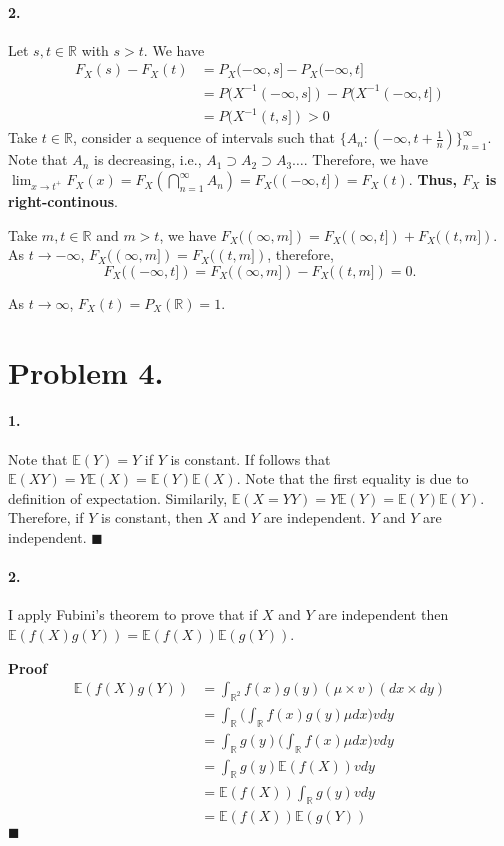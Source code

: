 \documentclass[11pt]{article}
\theoremstyle{definition}
\theoremstyle{boldtitle} %
\numberwithin{equation}{section}
\numberwithin{figure}{section}
\numberwithin{table}{section}
\begin{document}
\paragraph{2.} 
Let $s, t \in \mathbb{R}$ with $s > t$.
We have 
\begin{align*}
  F_X(s) - F_X(t) & = P_X(-\infty, s] - P_X(-\infty, t] \\ 
    & = P(X^{-1}(-\infty, s]) - P(X^{-1}(-\infty, t]) \\ 
    & = P(X^{-1}(t, s]) > 0
\end{align*}
Take $t \in \mathbb{R}$, consider a sequence of intervals such that 
$\{A_n: (-\infty, t + \frac{1}{n}) \}_{n=1}^\infty$.
Note that $A_n$ is decreasing, i.e., $A_1 \supset A_2 \supset A_3 \ldots$.
Therefore, we have $\lim_{x \rightarrow t^+} F_X(x) = F_X(\bigcap_{n=1}^\infty A_n) = F_X((-\infty, t]) = F_X(t)$.
\textbf{Thus, $F_X$ is right-continous}.

Take $m, t \in \mathbb{R}$ and $ m > t$, we have $F_X((\infty, m]) = F_X((\infty, t]) + F_X((t, m])$.
As $t \rightarrow -\infty$, $F_X((\infty, m]) = F_X((t, m])$,
therefore, 
\[
F_X((-\infty, t]) = F_X((\infty, m]) - F_X((t, m]) = 0.
\]

As $t \rightarrow \infty$, $F_X(t) = P_X(\mathbb{R}) = 1$.


\section*{Problem 4.} 
\paragraph{1.} Note that $\mathbb{E}(Y) = Y$ if $Y$ is constant.
If follows that $\mathbb{E}(XY) = Y \mathbb{E}(X) = \mathbb{E}(Y) \mathbb{E}(X)$.
Note that the first equality is due to definition of expectation.
Similarily, $\mathbb{E}(X=YY) = Y \mathbb{E}(Y) = \mathbb{E}(Y) \mathbb{E}(Y)$.
Therefore, if $Y$ is constant, then $X$ and $Y$ are independent.
$Y$ and $Y$ are independent. \(\blacksquare\)

\paragraph{2.} I apply Fubini's theorem to prove that if $X$ and $Y$ are 
independent then $\mathbb{E}(f(X)g(Y)) = \mathbb{E}(f(X)) \mathbb{E}(g(Y))$.

\textbf{Proof} 
\begin{align*}
  \mathbb{E}(f(X)g(Y)) & = \int_{\mathbb{R}^2} f(x)g(y) (\mu \times v) (dx \times dy) \\
  & = \int_{\mathbb{R}}\bigg(\int_{\mathbb{R}} f(x)g(y)\mu dx \bigg) v dy \\
  & = \int_{\mathbb{R}}g(y) \bigg(\int_{\mathbb{R}} f(x)\mu dx \bigg) v dy \\
  & = \int_{\mathbb{R}}g(y) \mathbb{E}(f(X)) v dy \\
  & = \mathbb{E}(f(X))  \int_{\mathbb{R}}g(y) v dy \\
  & = \mathbb{E}(f(X)) \mathbb{E}(g(Y)) 
\end{align*}
\(\blacksquare\)


\end{document}
